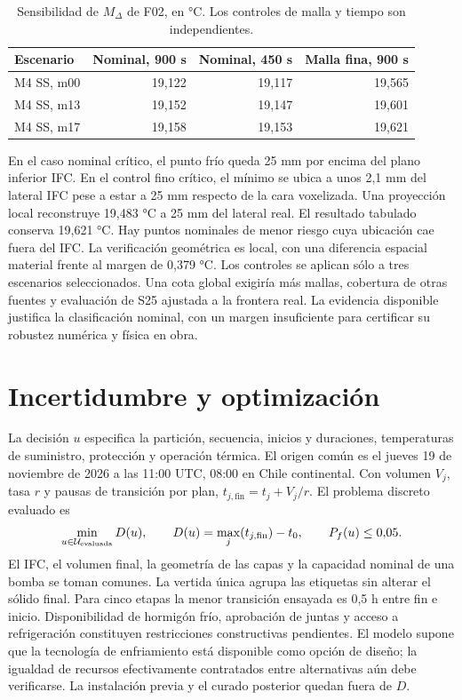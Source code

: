 \documentclass[11pt,a4paper]{article}
\begin{document}
\begin{table}[htbp]
\centering\small
\caption{Sensibilidad de $M_\Delta$ de F02, en °C. Los controles de malla y tiempo son independientes.}
\label{tab:control}
\begin{tabular}{@{}lrrr@{}}
\toprule
Escenario & Nominal, 900 s & Nominal, 450 s & Malla fina, 900 s \\
\midrule
M4 SS, m00 & 19,122 & 19,117 & 19,565 \\
M4 SS, m13 & 19,152 & 19,147 & 19,601 \\
M4 SS, m17 & 19,158 & 19,153 & 19,621 \\
\bottomrule
\end{tabular}
\end{table}

En el caso nominal crítico, el punto frío queda 25 mm por encima del plano inferior IFC. En el control fino crítico, el mínimo se ubica a unos 2,1 mm del lateral IFC pese a estar a 25 mm respecto de la cara voxelizada. Una proyección local reconstruye 19,483 °C a 25 mm del lateral real. El resultado tabulado conserva 19,621 °C. Hay puntos nominales de menor riesgo cuya ubicación cae fuera del IFC. La verificación geométrica es local, con una diferencia espacial material frente al margen de 0,379 °C. Los controles se aplican sólo a tres escenarios seleccionados. Una cota global exigiría más mallas, cobertura de otras fuentes y evaluación de S25 ajustada a la frontera real. La evidencia disponible justifica la clasificación nominal, con un margen insuficiente para certificar su robustez numérica y física en obra.
\FloatBarrier

\section{Incertidumbre y optimización}\label{sec:riesgo}
La decisión $u$ especifica la partición, secuencia, inicios y duraciones, temperaturas de suministro, protección y operación térmica. El origen común es el jueves 19 de noviembre de 2026 a las 11:00 UTC, 08:00 en Chile continental. Con volumen $V_j$, tasa $r$ y pausas de transición por plan, $t_{j,\mathrm{fin}}=t_j+V_j/r$. El problema discreto evaluado es
\begin{equation}
\min_{u\in\mathcal U_{\rm evaluada}} D(u),
\qquad D(u)=\max_j(t_{j,\mathrm{fin}})-t_0,
\qquad P_f(u)\le 0{,}05.
\label{eq:opt}
\end{equation}
El IFC, el volumen final, la geometría de las capas y la capacidad nominal de una bomba se toman comunes. La vertida única agrupa las etiquetas sin alterar el sólido final. Para cinco etapas la menor transición ensayada es 0,5 h entre fin e inicio. Disponibilidad de hormigón frío, aprobación de juntas y acceso a refrigeración constituyen restricciones constructivas pendientes. El modelo supone que la tecnología de enfriamiento está disponible como opción de diseño; la igualdad de recursos efectivamente contratados entre alternativas aún debe verificarse. La instalación previa y el curado posterior quedan fuera de $D$.
\end{document}
